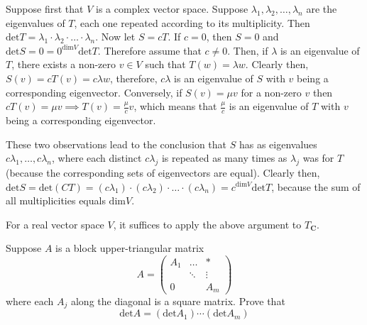 \begin{solution}

    Suppose first that $V$ is a complex vector space. Suppose $\lambda_1, \lambda_2, \ldots, \lambda_n$ are the eigenvalues of $T$, each one repeated according to its multiplicity. Then $\text{det} T = \lambda_1 \cdot \lambda_2 \cdot \ldots \cdot \lambda_n$. Now let $S = c T$. If $c = 0$, then $S = 0$ and $\text{det} S = 0 = 0^{\text{dim} V}\text{det} T$. Therefore assume that $c \neq 0$. Then, if $\lambda$ is an eigenvalue of $T$, there exists a non-zero $v \in V$ such that $T(w) = \lambda w$. Clearly then, $S(v) = cT(v) = c\lambda w$, therefore, $c\lambda$ is an eigenvalue of $S$ with $v$ being a corresponding eigenvector. Conversely, if $S(v) = \mu v$ for a non-zero $v$ then $cT(v) = \mu v \implies T(v) = \frac{\mu}{c} v$, which means that $\frac{\mu}{c}$ is an eigenvalue of $T$ with $v$ being a corresponding eigenvector.

    These two observations lead to the conclusion that $S$ has as eigenvalues $c\lambda_1, \ldots, c\lambda_n$, where each distinct $c\lambda_j$ is repeated as many times as $\lambda_j$ was for $T$ (because the corresponding sets of eigenvectors are equal). Clearly then, $\text{det} S = \text{det} (CT) = (c\lambda_1) \cdot (c\lambda_2) \cdot \ldots \cdot (c \lambda_n) = c^{\text{dim} V}\text{det} T$, because the sum of all multiplicities equals $\text{dim} V$.

    For a real vector space $V$, it suffices to apply the above argument to $T_\mathbf{C}$.
\end{solution}

\begin{exercise}{6}
    Suppose $A$ is a block upper-triangular matrix 
    $$A = \begin{pmatrix}
        A_1 & \ldots & * \\ \ & \ddots & \vdots \\ 0 & \ & A_m
    \end{pmatrix}$$
where each $A_j$ along the diagonal is a square matrix. Prove that $$\text{det} A = (\text{det} A_1)\cdots(\text{det} A_m)$$
\end{exercise}

